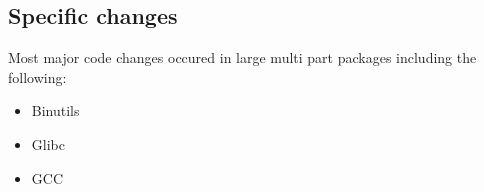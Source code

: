 \subsection{Specific changes}\label{Major changes}

Most major code changes occured in large multi part packages including the following:

\begin{itemize}
    \item Binutils
    \item Glibc
    \item GCC 
\end{itemize}
